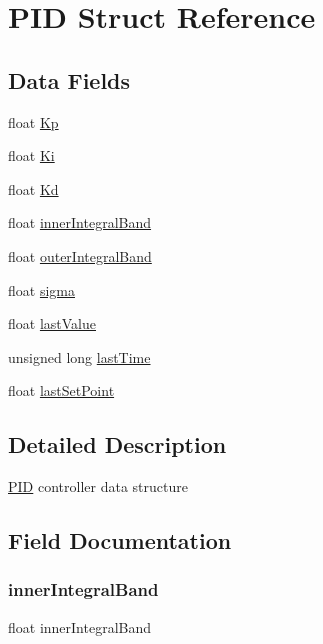 \hypertarget{struct_p_i_d}{}\section{P\+ID Struct Reference}
\label{struct_p_i_d}
\subsection*{Data Fields}
\begin{DoxyCompactItemize}
\item 
float \hyperlink{struct_p_i_d_a09cfc766a233ad617270562cc4146d07}{Kp}
\item 
float \hyperlink{struct_p_i_d_a59fac16f568541187ff485c4c47b0ec5}{Ki}
\item 
float \hyperlink{struct_p_i_d_a98268d71502ba080d88a9b1f50fdbe80}{Kd}
\item 
float \hyperlink{struct_p_i_d_a032c3f5739e042d209c972fc31e57fe3}{inner\+Integral\+Band}
\item 
float \hyperlink{struct_p_i_d_a02d0ee6d23eee5716d8e390aa387f237}{outer\+Integral\+Band}
\item 
float \hyperlink{struct_p_i_d_ae11aeeb83e22b5b7f1e6b4347eb1daa6}{sigma}
\item 
float \hyperlink{struct_p_i_d_a437b26536f3832d38c5d783076d310b1}{last\+Value}
\item 
unsigned long \hyperlink{struct_p_i_d_a22cb446e5271d5d2c4b2e23792fb1966}{last\+Time}
\item 
float \hyperlink{struct_p_i_d_a43ff6047780f4de51e46ea718c221fca}{last\+Set\+Point}
\end{DoxyCompactItemize}


\subsection{Detailed Description}
\hyperlink{struct_p_i_d}{P\+ID} controller data structure 

\subsection{Field Documentation}
\mbox{\label{struct_p_i_d_a032c3f5739e042d209c972fc31e57fe3}} 
\subsubsection{\texorpdfstring{inner\+Integral\+Band}{innerIntegralBand}}
{\footnotesize\ttfamily float inner\+Integral\+Band}

